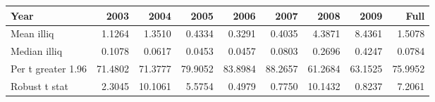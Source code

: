 \begin{tabular}{l|rrrrrrrr}
\toprule
Year & 2003 & 2004 & 2005 & 2006 & 2007 & 2008 & 2009 & Full \\
\midrule
Mean illiq & 1.1264 & 1.3510 & 0.4334 & 0.3291 & 0.4035 & 4.3871 & 8.4361 & 1.5078 \\
Median illiq & 0.1078 & 0.0617 & 0.0453 & 0.0457 & 0.0803 & 0.2696 & 0.4247 & 0.0784 \\
Per t greater 1.96 & 71.4802 & 71.3777 & 79.9052 & 83.8984 & 88.2657 & 61.2684 & 63.1525 & 75.9952 \\
Robust t stat & 2.3045 & 10.1061 & 5.5754 & 0.4979 & 0.7750 & 10.1432 & 0.8237 & 7.2061 \\
\bottomrule
\end{tabular}

